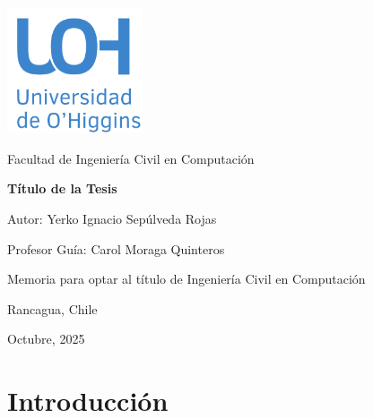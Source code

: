 \documentclass[12pt,a4paper]{report}
\begin{document}
\begin{titlepage}
    \centering
    {\includegraphics[width=0.3\textwidth]{data/logo.png}\par}
    


    {\Large\sffamily\textcolor{uoh}{Facultad de Ingeniería Civil en Computación}\par}
    \vspace{3cm}
    {\huge\bfseries Título de la Tesis \par}
    \vspace{5cm}

    {\normalsize Autor: Yerko Ignacio Sepúlveda Rojas \par}
    {\normalsize Profesor Guía: Carol Moraga Quinteros \par}
    \vspace{4cm}
    {\normalsize Memoria para optar al título de Ingeniería Civil en Computación \par}
    \vfill
    {\normalsize Rancagua, Chile \par}
    {\normalsize Octubre, 2025 \par}
\end{titlepage}
\tableofcontents
\listoffigures
\listoftables

\clearpage
{} %

\chapter*{Introducción}
\setcounter{page}{1}   %
\end{document}
